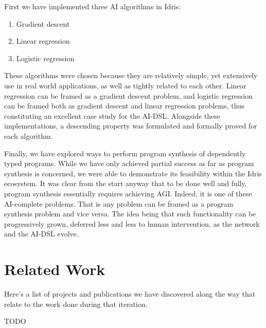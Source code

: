 \documentclass[]{report}
\begin{document}
First we have implemented three AI algorithms in Idris:
\begin{enumerate}
\item Gradient descent
\item Linear regression
\item Logistic regression
\end{enumerate}
These algorithms were chosen because they are relatively simple, yet
extensively use in real world applications, as well as tightly related
to each other.  Linear regression can be framed as a gradient descent
problem, and logistic regression can be framed both as gradient
descent and linear regression problems, thus constituting an excellent
case study for the AI-DSL.  Alongside these implementations, a
descending property was formulated and formally proved for each
algorithm.

Finally, we have explored ways to perform program synthesis of
dependently typed programs.  While we have only achieved partial
success as far as program synthesis is concerned, we were able to
demonstrate its feasibility within the Idris ecosystem.  It was clear
from the start anyway that to be done well and fully, program
synthesis essentially requires achieving AGI.  Indeed, it is one of
these AI-complete problems.  That is any problem can be framed as a
program synthesis problem and vice versa.  The idea being that such
functionality can be progressively grown, deferred less and less to
human intervention, as the network and the AI-DSL evolve.

\section{Related Work}

Here's a list of projects and publications we have discovered along
the way that relate to the work done during that iteration.

TODO

\end{document}
